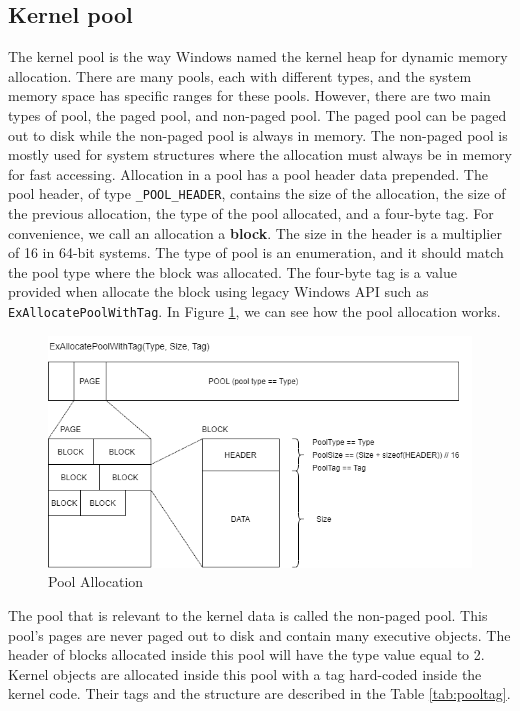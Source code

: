 \subsection[Kernel pool]{Kernel pool}
\label{sec:pool}

The kernel pool is the way Windows named the kernel heap for dynamic memory
allocation. There are many pools, each with different types, and the system
memory space has specific ranges for these pools. However, there are two main
types of pool, the paged pool, and non-paged pool. The paged pool can be paged
out to disk while the non-paged pool is always in memory. The non-paged pool is
mostly used for system structures where the allocation must always be in memory
for fast accessing. Allocation in a pool has a pool header data prepended.  The
pool header, of type \texttt{\_POOL\_HEADER}, contains the size of the
allocation, the size of the previous allocation, the type of the pool
allocated, and a four-byte tag. For convenience, we call an allocation a
\textbf{block}.  The size in the header is a multiplier of 16 in 64-bit
systems.  The type of pool is an enumeration, and it should match the pool type
where the block was allocated. The four-byte tag is a value provided when
allocate the block using legacy Windows API such as
\texttt{ExAllocatePoolWithTag}. In Figure \ref{fig:pooltag}, we can see how the
pool allocation works.

\begin{figure}[h]
  \centering
  \caption{Pool Allocation}
  \label{fig:pooltag}
  \includegraphics[scale=0.7]{images/pooltag.png}
\end{figure}

The pool that is relevant to the kernel data is called the non-paged pool. This
pool's pages are never paged out to disk and contain many executive objects.
The header of blocks allocated inside this pool will have the type value equal
to 2. Kernel objects are allocated inside this pool with a tag hard-coded
inside the kernel code. Their tags and the structure are described in the Table
\ref{tab:pooltag}.

